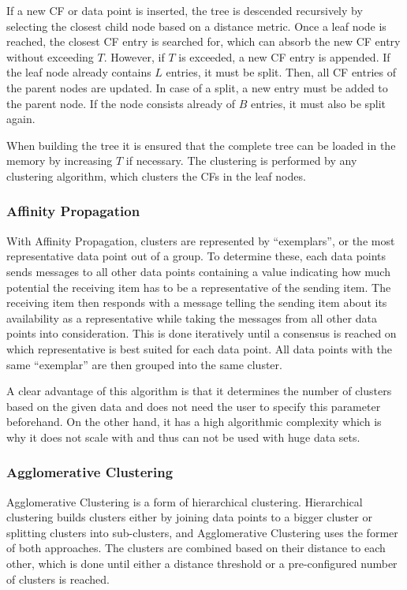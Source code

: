 If a new CF or data point is inserted, the tree is descended recursively by selecting the closest child node based on a distance metric.
Once a leaf node is reached, the closest CF entry is searched for, which can absorb the new CF entry without exceeding $T$.
However, if $T$ is exceeded, a new CF entry is appended.
If the leaf node already contains $L$ entries, it must be split.
Then, all CF entries of the parent nodes are updated.
In case of a split, a new entry must be added to the parent node.
If the node consists already of $B$ entries, it must also be split again.

When building the tree it is ensured that the complete tree can be loaded in the memory by increasing $T$ if necessary.
The clustering is performed by any clustering algorithm, which clusters the CFs in the leaf nodes.\cite{birch}

\subsubsection{Affinity Propagation}
With Affinity Propagation, clusters are represented by ``exemplars'', or the most representative data point out of a group. To determine these, each data points sends messages to all other data points containing a value indicating how much potential the receiving item has to be a representative of the sending item. The receiving item then responds with a message telling the sending item about its availability as a representative while taking the messages from all other data points into consideration. This is done iteratively until a consensus is reached on which representative is best suited for each data point. All data points with the same ``exemplar'' are then grouped into the same cluster.\cite{affinity_propagation}

A clear advantage of this algorithm is that it determines the number of clusters based on the given data and does not need the user to specify this parameter beforehand. On the other hand, it has a high algorithmic complexity which is why it does not scale with and thus can not be used with huge data sets.

\subsubsection{Agglomerative Clustering}
Agglomerative Clustering is a form of hierarchical clustering. Hierarchical clustering builds clusters either by joining data points to a bigger cluster or splitting clusters into sub-clusters, and Agglomerative Clustering uses the former of both approaches. The clusters are combined based on their distance to each other, which is done until either a distance threshold or a pre-configured number of clusters is reached.\cite{yildirim_2020}

